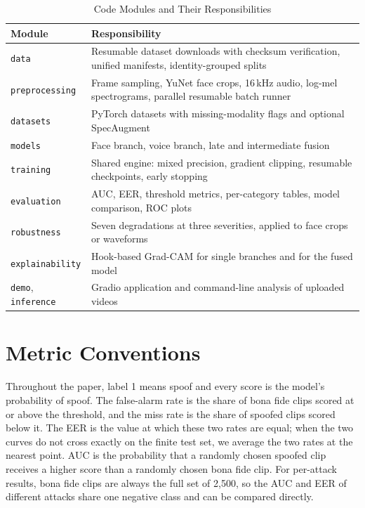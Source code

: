 \documentclass[conference]{IEEEtran}
\begin{document}
\begin{table}[!t]
\caption{Code Modules and Their Responsibilities}
\label{tab:repo}
\centering
\footnotesize
\begin{tabular}{@{}>{\raggedright\arraybackslash}p{1.9cm}>{\raggedright\arraybackslash}p{5.3cm}@{}}
\toprule
Module & Responsibility\\
\midrule
\texttt{data} & Resumable dataset downloads with checksum verification, unified manifests, identity-grouped splits\\
\texttt{preprocessing} & Frame sampling, YuNet face crops, 16\,kHz audio, log-mel spectrograms, parallel resumable batch runner\\
\texttt{datasets} & PyTorch datasets with missing-modality flags and optional SpecAugment\\
\texttt{models} & Face branch, voice branch, late and intermediate fusion\\
\texttt{training} & Shared engine: mixed precision, gradient clipping, resumable checkpoints, early stopping\\
\texttt{evaluation} & AUC, EER, threshold metrics, per-category tables, model comparison, ROC plots\\
\texttt{robustness} & Seven degradations at three severities, applied to face crops or waveforms\\
\texttt{explainability} & Hook-based Grad-CAM for single branches and for the fused model\\
\texttt{demo}, \texttt{inference} & Gradio application and command-line analysis of uploaded videos\\
\bottomrule
\end{tabular}
\end{table}

\section{Metric Conventions}
Throughout the paper, label 1 means spoof and every score is the model's probability of spoof. The false-alarm rate is the share of bona fide clips scored at or above the threshold, and the miss rate is the share of spoofed clips scored below it. The EER is the value at which these two rates are equal; when the two curves do not cross exactly on the finite test set, we average the two rates at the nearest point. AUC is the probability that a randomly chosen spoofed clip receives a higher score than a randomly chosen bona fide clip. For per-attack results, bona fide clips are always the full set of 2{,}500, so the AUC and EER of different attacks share one negative class and can be compared directly.



\end{document}
